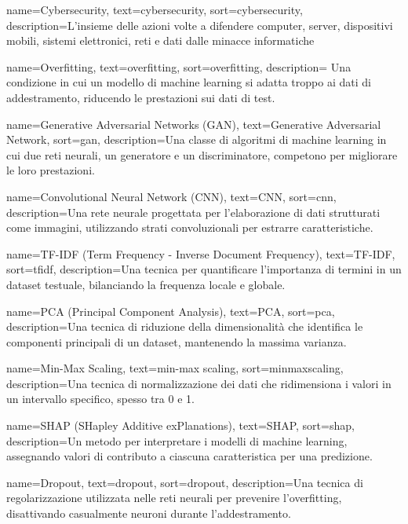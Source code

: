 
 {
    name={Cybersecurity},
    text={cybersecurity},
    sort={cybersecurity},
    description={L'insieme delle azioni volte a difendere computer, server, dispositivi mobili, sistemi elettronici, reti e dati dalle minacce informatiche}
}

 {
    name={Overfitting},
    text={overfitting},
    sort={overfitting},
    description={ Una condizione in cui un modello di machine learning si adatta troppo ai dati di addestramento, riducendo le prestazioni sui dati di test.}
}

 {
    name={Generative Adversarial Networks (GAN)},
    text={Generative Adversarial Network},
    sort={gan},
    description={Una classe di algoritmi di machine learning in cui due reti neurali, un generatore e un discriminatore, competono per migliorare le loro prestazioni.}
}

 {
    name={Convolutional Neural Network (CNN)},
    text={CNN},
    sort={cnn},
    description={Una rete neurale progettata per l'elaborazione di dati strutturati come immagini, utilizzando strati convoluzionali per estrarre caratteristiche.}
}

 {
    name={TF-IDF (Term Frequency - Inverse Document Frequency)},
    text={TF-IDF},
    sort={tfidf},
    description={Una tecnica per quantificare l'importanza di termini in un dataset testuale, bilanciando la frequenza locale e globale.}
}

 {
    name={PCA (Principal Component Analysis)},
    text={PCA},
    sort={pca},
    description={Una tecnica di riduzione della dimensionalità che identifica le componenti principali di un dataset, mantenendo la massima varianza.}
}

 {
    name={Min-Max Scaling},
    text={min-max scaling},
    sort={minmaxscaling},
    description={Una tecnica di normalizzazione dei dati che ridimensiona i valori in un intervallo specifico, spesso tra 0 e 1.}
}

 {
    name={SHAP (SHapley Additive exPlanations)},
    text={SHAP},
    sort={shap},
    description={Un metodo per interpretare i modelli di machine learning, assegnando valori di contributo a ciascuna caratteristica per una predizione.}
}

 {
    name={Dropout},
    text={dropout},
    sort={dropout},
    description={Una tecnica di regolarizzazione utilizzata nelle reti neurali per prevenire l'overfitting, disattivando casualmente neuroni durante l'addestramento.}
}

